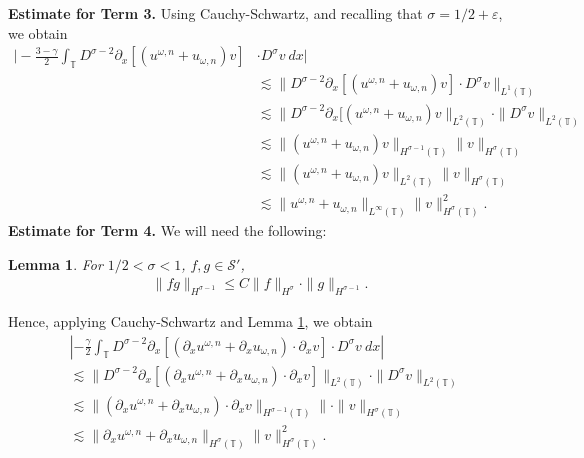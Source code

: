 \documentclass[12pt,reqno]{amsart}
\newcommand{\p}{\partial}
\newcommand{\ci}{\mathbb{T}}
\newcommand{\ee}{\varepsilon}
\theoremstyle{plain}  %
\newtheorem{lemma}{Lemma}
\theoremstyle{definition}
\begin{document}
%
\vskip0.1in
{\bf Estimate for Term 3.} Using Cauchy-Schwartz, and recalling that
$\sigma = 1/2 + \ee$,  we obtain
\begin{equation}
	\begin{split}
		\bigg | -\frac{3-\gamma}{2} \int_{\ci} D^{\sigma -2} \p_x \left[
		(u^{\omega,n} + u_{\omega,n})v \right]
		& \cdot D^\sigma v \ dx \bigg |
		\\
		& \lesssim
		\|D^{\sigma -2 } \p_x [(u^{\omega,n} + u_{\omega,n})v] \cdot D^\sigma v
		\|_{L^1(\ci)}
		\\
		& \lesssim \|D^{\sigma -2 } \p_x [(u^{\omega,n} +
		u_{\omega,n})v\|_{L^2(\ci)} \cdot \|D^\sigma v \|_{L^2(\ci)}
		\\
		& \lesssim \|(u^{\omega,n} + u_{\omega,n})v \|_{H^{\sigma -1 }(\ci)}
		\|v\|_{H^\sigma(\ci)}
		\\
		& \lesssim \|(u^{\omega,n} + u_{\omega,n})v \|_{L^2(\ci)} \|v\|_{H^\sigma(\ci)}
		\\
		& \lesssim \|u^{\omega,n} + u_{\omega,n} \|_{L^\infty(\ci)} \|v\|_{H^\sigma(\ci)}^2.
		\label{9}
	\end{split}
\end{equation}
%
{\bf Estimate for Term 4.}
We will need the following:
\begin{lemma}
	\label{impo}
	For $1/2 < \sigma < 1 $, $f,g \in \mathcal{S'}$,
	\begin{equation}
		\begin{split}
			\|fg\|_{H^{\sigma - 1}} \le C \|f\|_{H^{\sigma}}
			\cdot \|g\|_{H^{\sigma -1}}.
			\label{11}
		\end{split}
	\end{equation}
\end{lemma}
%
	Hence, applying Cauchy-Schwartz and Lemma \ref{impo}, we obtain
	\begin{equation}
		\begin{split}
			& \left | -\frac{\gamma}{2} \int_{\ci} D^{\sigma -2 } \p_x \left[
			\left( \p_x u^{\omega,n} + \p_x u_{\omega,n} \right) \cdot \p_x v
			\right] \cdot D^\sigma v \ dx \right |
			\\
			& \lesssim \|D^{\sigma -2} \p_x [(\p_x u^{\omega,n} + \p_x
			u_{\omega,n}) \cdot \p_x v]\|_{L^2(\ci)} \cdot \|D^\sigma v
			\|_{L^2(\ci)}
			\\
			& \lesssim \|(\p_x u^{\omega,n} + \p_x u_{\omega,n}) \cdot \p_x v
			\|_{H^{\sigma -1}(\ci)} \| \cdot \|v\|_{H^\sigma (\ci)} 
			\\
			& \lesssim \|\p_x u^{\omega,n} + 
			\p_x u_{\omega,n}
			\|_{H^\sigma(\ci)} \|v\|_{H^\sigma(\ci)}^2.
			\label{12}
		\end{split}
	\end{equation}
\end{document}
